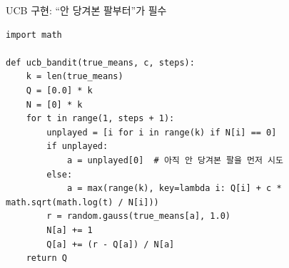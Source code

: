 \begin{frame}[fragile]{UCB 구현: ``안 당겨본 팔부터''가 필수}
\begin{lstlisting}
import math

def ucb_bandit(true_means, c, steps):
    k = len(true_means)
    Q = [0.0] * k
    N = [0] * k
    for t in range(1, steps + 1):
        unplayed = [i for i in range(k) if N[i] == 0]
        if unplayed:
            a = unplayed[0]  # 아직 안 당겨본 팔을 먼저 시도
        else:
            a = max(range(k), key=lambda i: Q[i] + c * math.sqrt(math.log(t) / N[i]))
        r = random.gauss(true_means[a], 1.0)
        N[a] += 1
        Q[a] += (r - Q[a]) / N[a]
    return Q
\end{lstlisting}


\end{frame}
